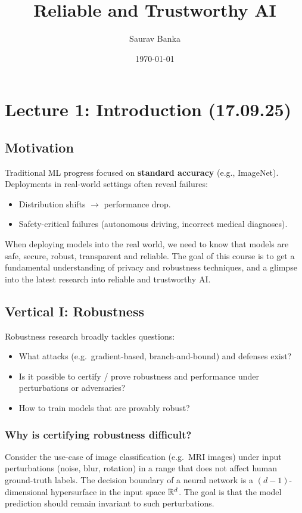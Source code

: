 \documentclass[11pt]{article}
\title{Reliable and Trustworthy AI}
\author{Saurav Banka}
\date{\today}
\begin{document}
\maketitle

\section{Lecture 1: Introduction (17.09.25)}
\subsection{Motivation} %
\label{sub:motivation}
Traditional ML progress focused on \textbf{standard accuracy} (e.g., ImageNet).  
Deployments in real-world settings often reveal failures:
\begin{itemize}
    \item Distribution shifts $\rightarrow$ performance drop.
    \item Safety-critical failures (autonomous driving, incorrect medical diagnoses).
\end{itemize} 

When deploying models into the real world, we need to know that models are safe, secure, robust, transparent and reliable. The goal of this course is to get a fundamental understanding of privacy and robustness techniques, and a glimpse into the latest research into reliable and trustworthy AI.

\subsection{Vertical I: Robustness}
\label{sub:robustness_intro}
Robustness research broadly tackles questions:
\begin{itemize}
	\item What attacks (e.g.\ gradient-based, branch-and-bound) and defenses exist?
	\item Is it possible to certify / prove robustness and performance under perturbations or adversaries?
	\item How to train models that are provably robust?
\end{itemize}

\subsubsection{Why is certifying robustness difficult?}
Consider the use-case of image classification (e.g.\ MRI images) under input perturbations (noise, blur, rotation) in a range that does not affect human ground-truth labels.  
The decision boundary of a neural network is a $(d-1)$-dimensional hypersurface in the input space $\mathbb{R}^d$.  
The goal is that the model prediction should remain invariant to such perturbations.
\end{document}
